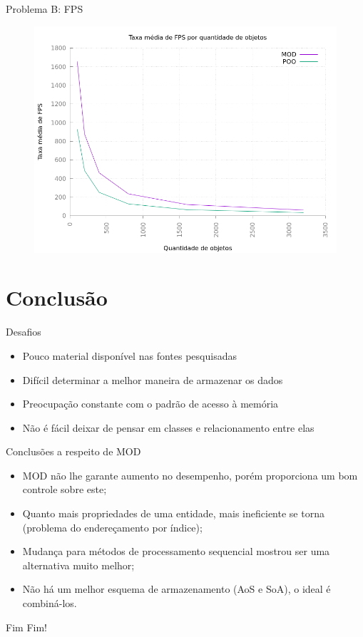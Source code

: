 \documentclass{beamer}
\begin{document}
\begin{frame}{Problema B: FPS}
    \begin{figure}[h!]
        \centering
        \includegraphics[width =.8\textwidth]{figuras/fpsv2}
        \par\medskip
    \end{figure}
\end{frame}

\section{Conclusão}

\frame{\tableofcontents[currentsection]}

\begin{frame}{Desafios}
    \begin{itemize}
        \item Pouco material disponível nas fontes pesquisadas
        \item Difícil determinar a melhor maneira de armazenar os dados
        \item Preocupação constante com o padrão de acesso à memória
        \item Não é fácil deixar de pensar em classes e relacionamento entre elas
    \end{itemize}
\end{frame}

\begin{frame}{Conclusões a respeito de MOD}
    \begin{itemize}
        \item MOD não lhe garante aumento no desempenho, porém 
            proporciona um bom controle sobre este;
        \item Quanto mais propriedades de uma entidade, mais 
            ineficiente se torna (problema do endereçamento por 
            índice);
        \item Mudança para métodos de processamento sequencial mostrou 
            ser uma alternativa muito melhor;
        \item Não há um melhor esquema de armazenamento (AoS e SoA), 
            o ideal é combiná-los.
    \end{itemize}
\end{frame}

\begin{frame}{Fim}
    \centering
    \LARGE{Fim!}
\end{frame}
\end{document}
